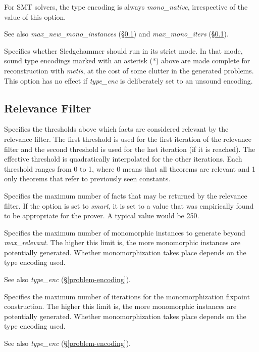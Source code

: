 \documentclass[a4paper,12pt]{article}
\begin{document}
\begin{enum}
For SMT solvers, the type encoding is always \textit{mono\_native}, irrespective
of the value of this option.

\nopagebreak
{\small See also \textit{max\_new\_mono\_instances} (\S\ref{relevance-filter})
and \textit{max\_mono\_iters} (\S\ref{relevance-filter}).}

Specifies whether Sledgehammer should run in its strict mode. In that mode,
sound type encodings marked with an asterisk (*) above are made complete
for reconstruction with \textit{metis}, at the cost of some clutter in the
generated problems. This option has no effect if \textit{type\_enc} is
deliberately set to an unsound encoding.
\end{enum}

\subsection{Relevance Filter}
\label{relevance-filter}

\begin{enum}
Specifies the thresholds above which facts are considered relevant by the
relevance filter. The first threshold is used for the first iteration of the
relevance filter and the second threshold is used for the last iteration (if it
is reached). The effective threshold is quadratically interpolated for the other
iterations. Each threshold ranges from 0 to 1, where 0 means that all theorems
are relevant and 1 only theorems that refer to previously seen constants.

Specifies the maximum number of facts that may be returned by the relevance
filter. If the option is set to \textit{smart}, it is set to a value that was
empirically found to be appropriate for the prover. A typical value would be
250.

Specifies the maximum number of monomorphic instances to generate beyond
\textit{max\_relevant}. The higher this limit is, the more monomorphic instances
are potentially generated. Whether monomorphization takes place depends on the
type encoding used.

\nopagebreak
{\small See also \textit{type\_enc} (\S\ref{problem-encoding}).}

Specifies the maximum number of iterations for the monomorphization fixpoint
construction. The higher this limit is, the more monomorphic instances are
potentially generated. Whether monomorphization takes place depends on the
type encoding used.

\nopagebreak
{\small See also \textit{type\_enc} (\S\ref{problem-encoding}).}
\end{enum}
\end{document}
